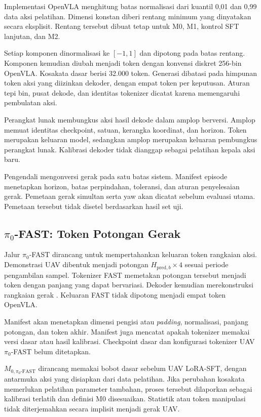 Implementasi OpenVLA menghitung batas normalisasi dari kuantil 0,01 dan 0,99 data aksi pelatihan. Dimensi konstan diberi rentang minimum yang dinyatakan secara eksplisit. Rentang tersebut dibuat tetap untuk M0, M1, kontrol SFT lanjutan, dan M2.

Setiap komponen dinormalisasi ke $[-1,1]$ dan dipotong pada batas rentang. Komponen kemudian diubah menjadi token dengan konvensi diskret 256-bin OpenVLA. Kosakata dasar berisi 32.000 token. Generasi dibatasi pada himpunan token aksi yang diizinkan dekoder, dengan empat token per keputusan. Aturan tepi bin, pusat dekode, dan identitas tokenizer dicatat karena memengaruhi pembulatan aksi.

Perangkat lunak membungkus aksi hasil dekode dalam amplop berversi. Amplop memuat identitas checkpoint, satuan, kerangka koordinat, dan horizon. Token merupakan keluaran model, sedangkan amplop merupakan keluaran pembungkus perangkat lunak. Kalibrasi dekoder tidak dianggap sebagai pelatihan kepala aksi baru.

Pengendali mengonversi gerak pada satu batas sistem. Manifest episode menetapkan horizon, batas perpindahan, toleransi, dan aturan penyelesaian gerak. Pemetaan gerak simultan serta yaw akan dicatat sebelum evaluasi utama. Pemetaan tersebut tidak disetel berdasarkan hasil set uji.

\subsection{$\pi_0$-FAST: Token Potongan Gerak}
\label{subsec:fast_action}
Jalur $\pi_0$-FAST dirancang untuk mempertahankan keluaran token rangkaian aksi. Demonstrasi UAV dibentuk menjadi potongan $H_{\mathrm{pred},b}\times4$ sesuai periode pengambilan sampel. Tokenizer FAST memetakan potongan tersebut menjadi token dengan panjang yang dapat bervariasi. Dekoder kemudian merekonstruksi rangkaian gerak \citep{pertsch2025fast}. Keluaran FAST tidak dipotong menjadi empat token OpenVLA.

Manifest akan menetapkan dimensi pengisi atau \textit{padding}, normalisasi, panjang potongan, dan token akhir. Manifest juga mencatat apakah tokenizer memakai versi dasar atau hasil kalibrasi. Checkpoint dasar dan konfigurasi tokenizer UAV $\pi_0$-FAST belum ditetapkan.

$M_{0,\pi_0\text{-FAST}}$ dirancang memakai bobot dasar sebelum UAV LoRA-SFT, dengan antarmuka aksi yang disiapkan dari data pelatihan. Jika perubahan kosakata memerlukan pelatihan parameter tambahan, proses tersebut dilaporkan sebagai kalibrasi terlatih dan definisi M0 disesuaikan. Statistik atau token manipulasi tidak diterjemahkan secara implisit menjadi gerak UAV.

